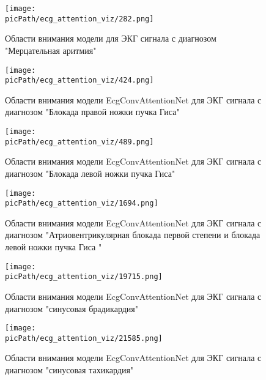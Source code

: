 \documentclass[oneside,final,14pt]{extreport}
\newcommand{\picPath}{img}
\begin{document}
\begin{figure}[H]
\begin{center}
\texttt{[image: \\picPath/ecg\_attention\_viz/282.png]}
\end{center}
  \caption{Области внимания модели для ЭКГ сигнала с диагнозом "Мерцательная аритмия"}
  \label{pic:att_282.png}
\end{figure}
\newpage
\begin{figure}[H]
\begin{center}
\texttt{[image: \\picPath/ecg\_attention\_viz/424.png]}
\end{center}
  \caption{Области внимания модели EcgConvAttentionNet для ЭКГ сигнала с диагнозом "Блокада правой ножки пучка Гиса"}

\end{figure}
\newpage
\begin{figure}[H]
\begin{center}
\texttt{[image: \\picPath/ecg\_attention\_viz/489.png]}
\end{center}
  \caption{Области внимания модели EcgConvAttentionNet для ЭКГ сигнала с диагнозом "Блокада левой ножки пучка Гиса"}

\end{figure}
\newpage

\begin{figure}[H]
\begin{center}
\texttt{[image: \\picPath/ecg\_attention\_viz/1694.png]}
\end{center}
  \caption{Области внимания модели EcgConvAttentionNet для ЭКГ сигнала с диагнозом "Атриовентрикулярная блокада первой степени и блокада левой ножки пучка Гиса "}
  
\end{figure}
\newpage
\begin{figure}[H]
\begin{center}
\texttt{[image: \\picPath/ecg\_attention\_viz/19715.png]}
\end{center}
  \caption{Области внимания модели EcgConvAttentionNet для ЭКГ сигнала с диагнозом "синусовая брадикардия"}

\end{figure}
\newpage
\begin{figure}[H]
\begin{center}
\texttt{[image: \\picPath/ecg\_attention\_viz/21585.png]}
\end{center}
  \caption{Области внимания модели EcgConvAttentionNet для ЭКГ сигнала с диагнозом "синусовая тахикардия"}
  \label{pic:att_21585.png}
\end{figure}
\end{document}

